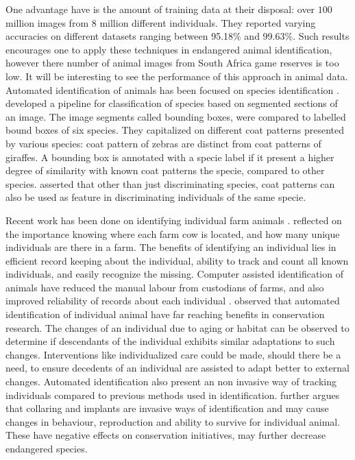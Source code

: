  One advantage \citeauthor{schroff2015facenet} \citeyear{schroff2015facenet} \cite{schroff2015facenet} have is the amount of training data at their disposal: over  $100$ million images from $8$ million different individuals. They reported varying accuracies on different datasets ranging between 95.18\% and 99.63\%. Such results encourages one to apply these techniques in endangered animal identification, however there number of animal images from South Africa game reserves is too low. It will be interesting to see the performance of this approach in animal data. 
Automated identification of animals has been focused on species identification \cite{norouzzadeh2018automatically}.
\citeauthor{parham2018animal} \citeyear{parham2018animal} \cite{parham2018animal} developed a pipeline for classification of species based on segmented sections of an image. The image segments called bounding boxes, were compared to labelled bound boxes of six species. They capitalized on different coat patterns presented by various species: coat pattern of zebras are distinct from coat patterns of giraffes. A bounding box is annotated with a specie label if it present a higher degree of similarity with known coat patterns the specie, compared to other species. \citeauthor{kuhl2013animal} \citeyear{kuhl2013animal} \cite{kuhl2013animal} asserted that other than just discriminating species, coat patterns can also be used as feature in discriminating individuals of the same specie.

Recent work has been done on identifying individual farm animals \cite{kumar2017real}. \citeauthor{kumar2017real} \citeyear{kumar2017real} \cite{kumar2017real} reflected on the importance knowing where each farm cow is located, and how many unique individuals are there in a farm. The benefits of identifying an individual lies in efficient record keeping about the individual, ability to track and count all known individuals, and easily recognize the missing. Computer assisted identification of animals have reduced the manual labour from custodians of farms, and also improved reliability of records about each individual \cite{kuhl2013animal}. \citeauthor{kuhl2013animal} \citeyear{kuhl2013animal} \cite{kuhl2013animal} observed that automated identification of individual animal have far reaching benefits in conservation research. The changes of an individual due to aging or habitat can be observed to determine if descendants of the individual exhibits similar adaptations to such changes. Interventions like individualized care could be made,  should there be a need, to ensure decedents of an individual are assisted to adapt better to external changes. Automated identification also present an non invasive way of tracking individuals compared to previous methods used in identification. \citeauthor{kuhl2013animal} \citeyear{kuhl2013animal} \cite{kuhl2013animal} further argues that collaring and implants are invasive ways of identification and may cause changes in behaviour, reproduction and ability to survive for individual animal. These have negative effects on conservation initiatives, may further decrease endangered species.

